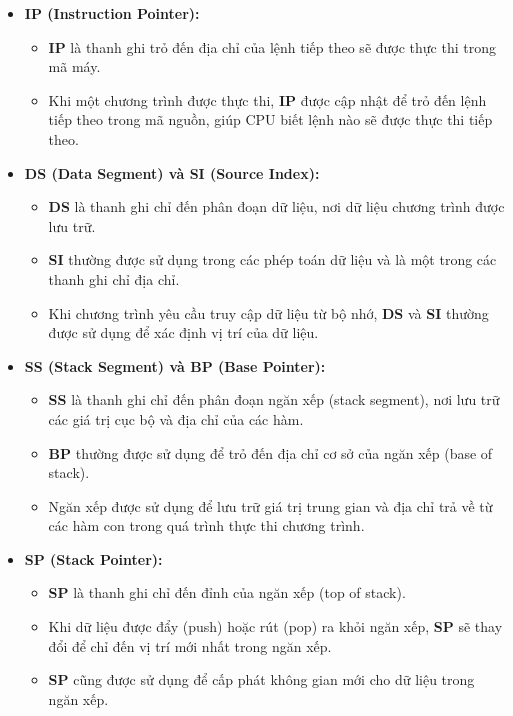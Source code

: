 \begin{itemize}
    \item \textbf{IP (Instruction Pointer):}
    \begin{itemize}
        \item \textbf{IP} là thanh ghi trỏ đến địa chỉ của lệnh tiếp theo sẽ được thực thi trong mã máy.
        \item Khi một chương trình được thực thi, \textbf{IP} được cập nhật để trỏ đến lệnh tiếp theo trong mã nguồn, giúp CPU biết lệnh nào sẽ được thực thi tiếp theo.
    \end{itemize}

    \item \textbf{DS (Data Segment) và SI (Source Index):}
    \begin{itemize}
        \item \textbf{DS} là thanh ghi chỉ đến phân đoạn dữ liệu, nơi dữ liệu chương trình được lưu trữ.
        \item \textbf{SI} thường được sử dụng trong các phép toán dữ liệu và là một trong các thanh ghi chỉ địa chỉ.
        \item Khi chương trình yêu cầu truy cập dữ liệu từ bộ nhớ, \textbf{DS} và \textbf{SI} thường được sử dụng để xác định vị trí của dữ liệu.
    \end{itemize}

    \item \textbf{SS (Stack Segment) và BP (Base Pointer):}
    \begin{itemize}
        \item \textbf{SS} là thanh ghi chỉ đến phân đoạn ngăn xếp (stack segment), nơi lưu trữ các giá trị cục bộ và địa chỉ của các hàm.
        \item \textbf{BP} thường được sử dụng để trỏ đến địa chỉ cơ sở của ngăn xếp (base of stack).
        \item Ngăn xếp được sử dụng để lưu trữ giá trị trung gian và địa chỉ trả về từ các hàm con trong quá trình thực thi chương trình.
    \end{itemize}

    \item \textbf{SP (Stack Pointer):}
    \begin{itemize}
        \item \textbf{SP} là thanh ghi chỉ đến đỉnh của ngăn xếp (top of stack).
        \item Khi dữ liệu được đẩy (push) hoặc rút (pop) ra khỏi ngăn xếp, \textbf{SP} sẽ thay đổi để chỉ đến vị trí mới nhất trong ngăn xếp.
        \item \textbf{SP} cũng được sử dụng để cấp phát không gian mới cho dữ liệu trong ngăn xếp.
    \end{itemize}
\end{itemize}

